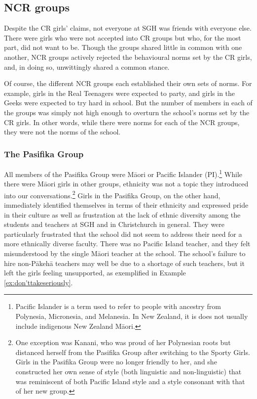   

\subsection{NCR groups}
Despite the CR girls' claims, not everyone at SGH was friends with everyone else.  There were girls who were not accepted into CR groups but who, for the most part, did not want to be.  Though the groups shared little in common with one another, NCR groups actively rejected the behavioural norms set by the CR girls, and, in doing so, unwittingly shared a common stance.  
 
Of course, the different NCR groups each established their own sets of norms.  For example, girls in the Real Teenagers were expected to party, and girls in the Geeks were expected to try hard in school.  But the number of members in each of the groups was simply not high enough to overturn the school's norms set by the CR girls.  In other words, while there were norms for each of the NCR groups, they were not the norms of the school.

\subsubsection{The Pasifika Group}

All members of the Pasifika Group were M\=aori or Pacific Islander (PI).\footnote{Pacific Islander is a term used to refer to people with ancestry from Polynesia, Micronesia, and Melanesia.  In New Zealand, it is does not usually include indigenous New Zealand M\=aori.} While there were M\=aori girls in other groups, ethnicity was not a topic they introduced into our conversations.\footnote{One exception was Kanani, who was proud of her Polynesian roots but distanced herself from the Pasifika Group after switching to the Sporty Girls.  Girls in the Pasifika Group were no longer friendly to her, and she constructed her own sense of style (both linguistic and non-linguistic) that was reminiscent of both Pacific Island style and a style consonant with that of her new group.}  Girls in the Pasifika Group, on the other hand, immediately identified themselves in terms of their ethnicity and expressed pride in their culture as well as frustration at the lack of ethnic diversity among the students and teachers at SGH and in Christchurch in general.  They were particularly frustrated that the school did not seem to address their need for a more ethnically diverse faculty.  There was no Pacific Island teacher, and they felt misunderstood by the single M\=aori teacher at the school.   The school's failure to hire non-P\=akeh\=a teachers may well be due to a shortage of such teachers, but it left the girls feeling unsupported, as exemplified in Example \ref{ex:don'ttakeseriously}.
  
